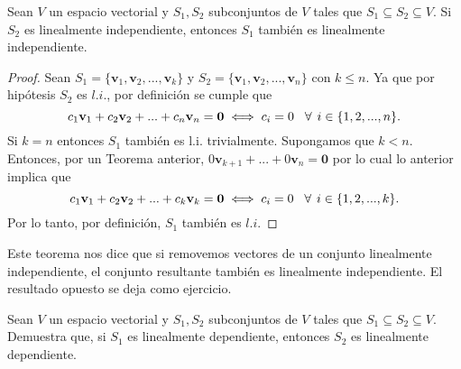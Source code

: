 \documentclass[notasLineal]{subfiles}
\begin{document}
\begin{Teo}\label{teo: Remover vectores a un conjunto linealmente independiente da un conjunto linealmente independiente}

    Sean $V$ un espacio vectorial y $S_1,S_2$ subconjuntos de $V$ tales que $S_1\subseteq S_2\subseteq V$. Si $S_2$ es linealmente independiente, entonces $S_1$ también es linealmente independiente.

\begin{proof}

    Sean $S_1=\{\mathbf{v}_1,\mathbf{v}_2, ..., \mathbf{v}_k\}$ y $S_2=\{\mathbf{v}_1,\mathbf{v}_2, ..., \mathbf{v}_n\}$ con $k\leq n$. Ya que por hipótesis $S_2$ es $l.i.$, por definición se cumple que $$c_1\mathbf{v}_1+c_2\mathbf{v}_2+...+c_n\mathbf{v}_n=\mathbf{0}\iff c_i=0\hspace{3mm}\forall\hspace{1.5mm}  i\in\{1,2, ..., n\}.$$ Si $k=n$ entonces $S_1$ también es l.i. trivialmente. Supongamos que $k<n$. Entonces, por un Teorema anterior, $0\mathbf{v}_{k+1}+...+0\mathbf{v}_n=\mathbf{0}$ por lo cual lo anterior implica que $$c_1\mathbf{v}_1+c_2\mathbf{v}_2+...+c_k\mathbf{v}_k=\mathbf{0}\iff c_i=0\hspace{3mm}\forall\hspace{1.5mm}  i\in\{1,2, ...,k\}.$$ Por lo tanto, por definición, $S_1$ también es $l.i$.

\end{proof}

Este teorema nos dice que si removemos vectores de un conjunto linealmente independiente, el conjunto resultante también es linealmente independiente. El resultado opuesto se deja como ejercicio.

\end{Teo}

\begin{Ejer}
    Sean $V$ un espacio vectorial y $S_1,S_2$ subconjuntos de $V$ tales que $S_1\subseteq S_2\subseteq V$. Demuestra que, si $S_1$ es linealmente dependiente, entonces $S_2$ es linealmente dependiente. 
\end{Ejer}
\end{document}
